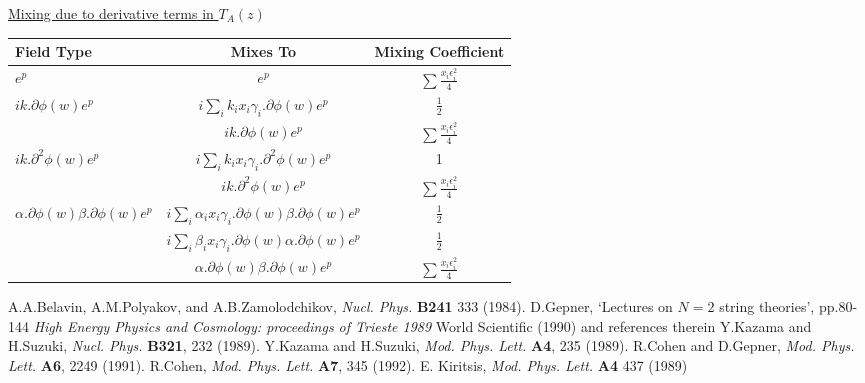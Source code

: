 \documentclass[a4paper,a4paper]{article}
\begin{document}
\underline{Mixing due to derivative terms in $T_A(z)$}
\newline
\begin{tabular}{|l|c|c|}
\hline
Field Type& Mixes To & Mixing Coefficient \\
\hline
$e^p$ & $ e^{p} $ & $\sum \frac{x_i \epsilon_i^2}{4}$ \\
\hline
$ik.\partial\phi(w) e^p$ & $ i\sum_i k_i x_i \gamma_i.\partial\phi(w) e^{p} $ & $\frac{1}{2}$\\
& $ ik.\partial\phi(w) e^{p} $ & $\sum \frac{x_i \epsilon_i^2}{4}$ \\
\hline
$ik.\partial^2\phi(w) e^p$ & $ i\sum_i k_i x_i \gamma_i.\partial^2\phi(w) e^{p} $ & 1\\
& $ ik.\partial^2\phi(w) e^{p} $ & $\sum \frac{x_i \epsilon_i^2}{4}$ \\
\hline
$\alpha.\partial\phi(w)\beta.\partial\phi(w) e^p$ &$ i\sum_i \alpha_i x_i \gamma_i.\partial\phi(w) \beta.\partial\phi(w) e^{p} $ & $\frac{1}{2}$\\
&$ i\sum_i \beta_i x_i \gamma_i.\partial\phi(w) \alpha.\partial\phi(w) e^{p} $ & $\frac{1}{2}$\\
&$ \alpha.\partial\phi(w) \beta.\partial\phi(w) e^{p} $ & $\sum \frac{x_i \epsilon_i^2}{4}$ \\
\hline
\end{tabular}
\newline

\begin{thebibliography}{99}

 A.A.Belavin, A.M.Polyakov, and A.B.Zamolodchikov, \emph{Nucl. Phys.} \textbf{B241} 333 (1984).
 D.Gepner, `Lectures on $N=2$ string theories', pp.80-144
              \emph{High Energy Physics and Cosmology: proceedings of Trieste 1989} World Scientific (1990) and references therein
 Y.Kazama and H.Suzuki, \emph{Nucl. Phys.} \textbf{B321}, 232 (1989).
 Y.Kazama and H.Suzuki, \emph{Mod. Phys. Lett.} \textbf{A4}, 235 (1989).
  R.Cohen and D.Gepner, \emph{Mod. Phys. Lett.} \textbf{A6}, 2249 (1991).
 R.Cohen, \emph{Mod. Phys. Lett.} \textbf{A7}, 345 (1992).
 E. Kiritsis, \emph{Mod. Phys. Lett.} \textbf{A4} 437 (1989)

\end{thebibliography}
\end{document}
